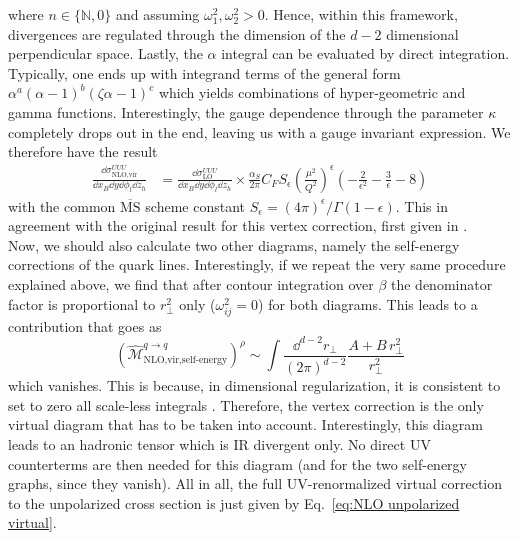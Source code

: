 where $n\in \{\mathbb{N},0\}$ and assuming $\omega^2_1,\omega^2_2>0$. Hence, within this framework, divergences are regulated through the dimension of the $d-2$ dimensional perpendicular space. Lastly, the $\alpha$ integral can be evaluated by direct integration. Typically, one ends up with integrand terms of the general form $\alpha^a (\alpha-1)^b (\zeta \alpha-1)^c$ which yields combinations of hyper-geometric and gamma functions. Interestingly, the gauge dependence through the parameter $\kappa$ completely drops out in the end, leaving us with a gauge invariant expression. We therefore have the result
\begin{equation}\label{eq:NLO unpolarized virtual}
\begin{aligned}
      \frac{\dd \sigma^{UUU}_{\text{NLO,vir}}}{\dd x_B \dd y \dd \phi_l \dd z_h}&= \frac{\dd \sigma^{UUU}_{\text{LO}}}{\dd x_B \dd y \dd \phi_l \dd z_h}\times\frac{\alpha_S}{2\pi}  C_F S_\epsilon \left(\frac{\mu^2}{Q^2}\right)^{\epsilon}\left(-\frac{2}{\epsilon^2}-\frac{3}{\epsilon}-8\right)
\end{aligned}
\end{equation}
with the common $\overline{\text{MS}}$ scheme constant $S_\epsilon=(4\pi)^\epsilon/\Gamma(1-\epsilon)$. This in agreement with the original result for this vertex correction, first given in \cite{altarelli_large_1979}. \\
Now, we should also calculate two other diagrams, namely the self-energy corrections of the quark lines. Interestingly, if we repeat the very same procedure explained above, we find that after contour integration over $\beta$ the denominator factor is proportional to $r_\perp^2$ only ($\omega^2_{ij}=0$) for both diagrams. This leads to a contribution that goes as
\begin{equation}
     (\hat{\mathcal{M}}^{q \to q}_{\text{NLO,vir,self-energy}})^\rho\sim\int\frac{\dd^{d-2} r_\perp}{(2\pi)^{d-2}}\frac{A+B\,r_\perp^2}{r_\perp^2}
\end{equation}
which vanishes. This is because, in dimensional regularization, it is consistent to set to zero all scale-less integrals \cite{Schwartz:2014sze}. Therefore, the vertex correction is the only virtual diagram that has to be taken into account. Interestingly, this diagram leads to an hadronic tensor which is IR divergent only. No direct UV counterterms are then needed for this diagram (and for the two self-energy graphs, since they vanish). All in all, the full UV-renormalized virtual correction to the unpolarized cross section is just given by Eq.~\ref{eq:NLO unpolarized virtual}.


